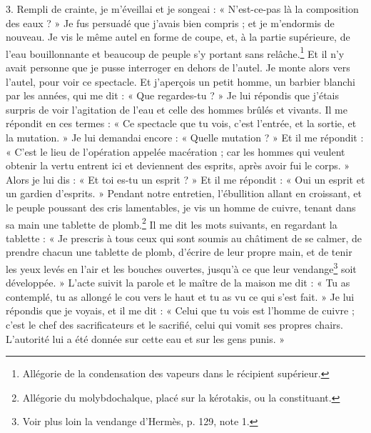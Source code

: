 \documentclass[a4paper, 11pt, oneside, polutonikogreek, french]{article}
\begin{document}
3. Rempli de crainte, je m'éveillai et je songeai : « N'est-ce-pas là la composition des eaux ? » Je fus persuadé que j'avais bien compris ; et je m'endormis de nouveau. Je vis le même autel en forme de coupe, et, à la partie supérieure, de l'eau bouillonnante et beaucoup de peuple s'y portant sans relâche.\footnote{Allégorie de la condensation des vapeurs dans le récipient supérieur.} Et il n'y avait personne que je pusse interroger en dehors de l'autel. Je monte alors vers l'autel, pour voir ce spectacle. Et j'aperçois un petit homme, un barbier blanchi par les années, qui me dit : « Que regardes-tu ? » Je lui répondis que j'étais surpris de voir l'agitation de l'eau et celle des hommes brûlés et vivants. Il me répondit en ces termes : « Ce spectacle que tu vois, c'est l'entrée, et la sortie, et la mutation. » Je lui demandai encore : « Quelle mutation ? » Et il me répondit : « C'est le lieu de l'opération appelée macération ; car les hommes qui veulent obtenir la vertu entrent ici et deviennent des esprits, après avoir fui le corps. » Alors je lui dis : « Et toi es-tu un esprit ? » Et il me répondit : « Oui un esprit et un gardien d'esprits. » Pendant notre entretien, l'ébullition allant en croissant, et le peuple poussant des cris lamentables, je vis un homme de cuivre, tenant dans sa main une tablette de plomb.\footnote{Allégorie du molybdochalque, placé sur la kérotakis, ou la constituant.} Il me dit les mots suivants, en regardant la tablette : « Je prescris à tous ceux qui sont soumis au châtiment de se calmer, de prendre chacun une tablette de plomb, d'écrire de leur propre main, et de tenir les yeux levés en l'air et les bouches ouvertes, jusqu'à ce que leur vendange\footnote{Voir plus loin la vendange d'Hermès, p. 129, note 1.} soit développée. » L'acte suivit la parole et le maître de la maison me dit : « Tu as contemplé, tu as allongé le cou vers le haut et tu as vu ce qui s'est fait. » Je lui répondis que je voyais, et il me dit : « Celui que tu vois est l'homme de cuivre ; c'est le chef des sacrificateurs et le sacrifié, celui qui vomit ses propres chairs. L'autorité lui a été donnée sur cette eau et sur les gens punis. »
\end{document}
